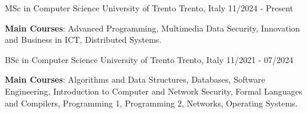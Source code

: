 
\begin{cventries}

	\cventry
	{MSc in Computer Science} %
	{University of Trento} %
	{Trento, Italy} %
	{11/2024 - Present} %
	{
		\begin{cvitems} %
			\item \textbf{Main Courses}: Advanced Programming, Multimedia Data Security, Innovation and Business in ICT, Distributed Systems.
		\end{cvitems}
	}


	\cventry
	{BSc in Computer Science} %
	{University of Trento} %
	{Trento, Italy} %
	{11/2021 - 07/2024} %
	{
		\begin{cvitems} %
			\item \textbf{Main Courses}: Algorithms and Data Structures, Databases, Software Engineering, Introduction to Computer and Network Security, Formal Languages and Compilers, Programming 1, Programming 2, Networks, Operating Systems.
		\end{cvitems}
	}

\end{cventries}
